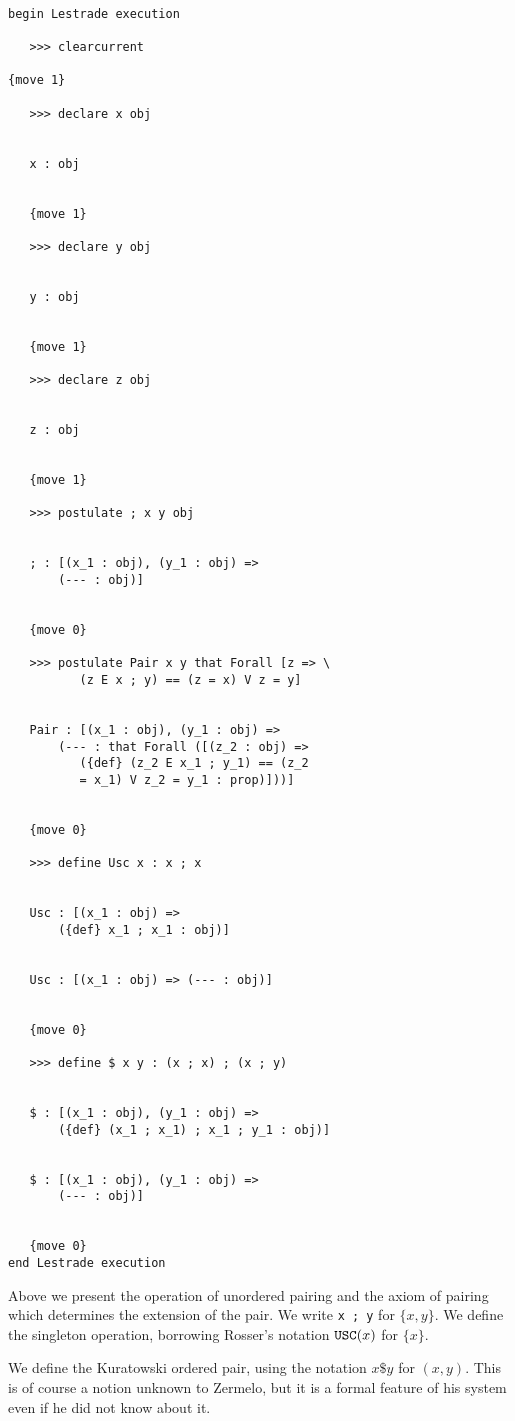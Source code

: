 \documentclass[12pt]{article}
\begin{document}
\begin{verbatim}

begin Lestrade execution

   >>> clearcurrent

{move 1}

   >>> declare x obj


   x : obj


   {move 1}

   >>> declare y obj


   y : obj


   {move 1}

   >>> declare z obj


   z : obj


   {move 1}

   >>> postulate ; x y obj


   ; : [(x_1 : obj), (y_1 : obj) => 
       (--- : obj)]


   {move 0}

   >>> postulate Pair x y that Forall [z => \
          (z E x ; y) == (z = x) V z = y]


   Pair : [(x_1 : obj), (y_1 : obj) => 
       (--- : that Forall ([(z_2 : obj) => 
          ({def} (z_2 E x_1 ; y_1) == (z_2 
          = x_1) V z_2 = y_1 : prop)]))]


   {move 0}

   >>> define Usc x : x ; x


   Usc : [(x_1 : obj) => 
       ({def} x_1 ; x_1 : obj)]


   Usc : [(x_1 : obj) => (--- : obj)]


   {move 0}

   >>> define $ x y : (x ; x) ; (x ; y)


   $ : [(x_1 : obj), (y_1 : obj) => 
       ({def} (x_1 ; x_1) ; x_1 ; y_1 : obj)]


   $ : [(x_1 : obj), (y_1 : obj) => 
       (--- : obj)]


   {move 0}
end Lestrade execution
\end{verbatim}

Above we present the operation of unordered pairing and the axiom of pairing which determines the extension of the pair.  We write {\tt x ; y} for $\{x,y\}$.  We define
 the singleton operation, borrowing Rosser's notation ${\tt USC}(x)$ for $\{x\}$.

We define the Kuratowski ordered pair, using the notation $x \$ y$ for $(x,y)$.  This is of course a notion unknown to Zermelo, but it is a formal feature of his system even if he did not know about it.
\end{document}
